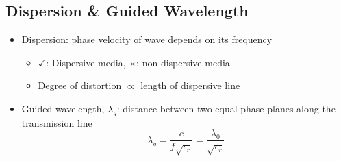 \documentclass[a4paper]{article}
\begin{document}
\subsection{Dispersion \& Guided Wavelength}
\begin{itemize}
    \item Dispersion: phase velocity of wave depends on its frequency
    \begin{itemize}[label=$\circ$]
        \item $\checkmark$: Dispersive media, $\times$: non-dispersive media
        \item Degree of distortion $\propto$ length of dispersive line
    \end{itemize}
    \item Guided wavelength, $\lambda_g$: distance between two equal phase planes along the transmission line
    $$\lambda_g = \frac{c}{f\sqrt{\epsilon_r}} = \frac{\lambda_0}{\sqrt{\epsilon_r}}$$
\end{itemize}

\newpage
\end{document}
